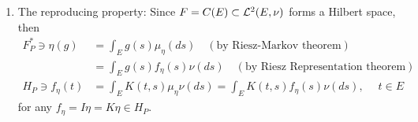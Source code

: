 \documentclass[11pt]{article}
\begin{document}
\begin{itemize}
\begin{definition}
\begin{enumerate}
\item The reproducing property: Since $F= C(E)\subset {\mathcal L}^{2}(E, \nu)$ forms a Hilbert space, then 
\begin{align*}
 F_{P}^{*} \ni \eta(g)& = \int_{E}g(s)\mu_{\eta}(ds)\quad (\text{by Riesz-Markov theorem})\\
&= \int_{E}g(s)f_{\eta}(s)\nu(ds) \quad (\text{by Riesz Representation theorem}) \\
 H_{P} \ni f_{\eta}(t)&= \int_{E}K(t,s)\mu_{\eta}\nu(ds)= \int_{E}K(t,s)f_{\eta}(s)\nu(ds),\quad \; t\in E
\end{align*} for any $f_{\eta}= I\eta =K\eta\in H_{P}$.


\end{enumerate}
\end{definition}




\end{itemize}
\end{document}
